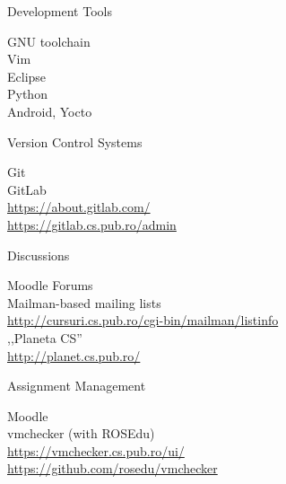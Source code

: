 \documentclass{simple}
\begin{document}
\begin{frame}{Development Tools}
  \begin{center}
    {\Large
      \pause GNU toolchain \\
    \vspace{0.3cm}
      \pause Vim \\
    \vspace{0.3cm}
      \pause Eclipse \\
    \vspace{0.3cm}
      \pause Python \\
    \vspace{0.3cm}
      \pause Android, Yocto
    }
  \end{center}
\end{frame}

\begin{frame}{Version Control Systems}
  \begin{center}
    {\Large
      \pause Git \\
    \vspace{0.3cm}
      \pause GitLab \\
      \url{https://about.gitlab.com/} \\
      \url{https://gitlab.cs.pub.ro/admin}
    }
  \end{center}
\end{frame}

\begin{frame}{Discussions}
  \begin{center}
    {\large
      \pause Moodle Forums \\
    \vspace{0.3cm}
      \pause Mailman-based mailing lists \\
      \url{http://cursuri.cs.pub.ro/cgi-bin/mailman/listinfo} \\
    \vspace{0.3cm}
      \pause ,,Planeta CS''\\
      \url{http://planet.cs.pub.ro/}
    }
  \end{center}
\end{frame}

\begin{frame}{Assignment Management}
  \begin{center}
    {\Large
      \pause Moodle \\
    \vspace{0.3cm}
      \pause vmchecker (with ROSEdu) \\
      \url{https://vmchecker.cs.pub.ro/ui/} \\
      \url{https://github.com/rosedu/vmchecker}
    }
  \end{center}
\end{frame}
\end{document}
